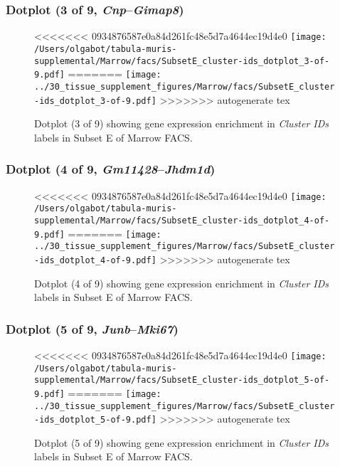 \clearpage

\subsubsection{Dotplot (3 of 9, \emph{Cnp}--\emph{Gimap8})}
\begin{figure}[h]
\centering
<<<<<<< 0934876587e0a84d261fc48e5d7a4644ec19d4e0
\texttt{[image: /Users/olgabot/tabula-muris-supplemental/Marrow/facs/SubsetE\_cluster-ids\_dotplot\_3-of-9.pdf]}
=======
\texttt{[image: ../30\_tissue\_supplement\_figures/Marrow/facs/SubsetE\_cluster-ids\_dotplot\_3-of-9.pdf]}
>>>>>>> autogenerate tex

\caption{ Dotplot (3 of 9)  showing gene expression enrichment in \emph{Cluster IDs} labels in Subset E of Marrow FACS. }
\end{figure}


\clearpage

\subsubsection{Dotplot (4 of 9, \emph{Gm11428}--\emph{Jhdm1d})}
\begin{figure}[h]
\centering
<<<<<<< 0934876587e0a84d261fc48e5d7a4644ec19d4e0
\texttt{[image: /Users/olgabot/tabula-muris-supplemental/Marrow/facs/SubsetE\_cluster-ids\_dotplot\_4-of-9.pdf]}
=======
\texttt{[image: ../30\_tissue\_supplement\_figures/Marrow/facs/SubsetE\_cluster-ids\_dotplot\_4-of-9.pdf]}
>>>>>>> autogenerate tex

\caption{ Dotplot (4 of 9)  showing gene expression enrichment in \emph{Cluster IDs} labels in Subset E of Marrow FACS. }
\end{figure}


\clearpage

\subsubsection{Dotplot (5 of 9, \emph{Junb}--\emph{Mki67})}
\begin{figure}[h]
\centering
<<<<<<< 0934876587e0a84d261fc48e5d7a4644ec19d4e0
\texttt{[image: /Users/olgabot/tabula-muris-supplemental/Marrow/facs/SubsetE\_cluster-ids\_dotplot\_5-of-9.pdf]}
=======
\texttt{[image: ../30\_tissue\_supplement\_figures/Marrow/facs/SubsetE\_cluster-ids\_dotplot\_5-of-9.pdf]}
>>>>>>> autogenerate tex

\caption{ Dotplot (5 of 9)  showing gene expression enrichment in \emph{Cluster IDs} labels in Subset E of Marrow FACS. }
\end{figure}



